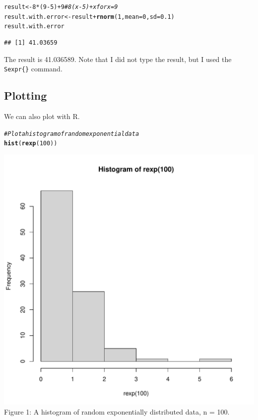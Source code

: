 \documentclass{article}\usepackage[]{graphicx}\usepackage[]{xcolor}
\makeatletter
\def\maxwidth{ %
  \ifdim\Gin@nat@width>\linewidth
    \linewidth
  \else
    \Gin@nat@width
  \fi
}
\newcommand{\hlnum}[1]{\textcolor[rgb]{0.686,0.059,0.569}{#1}}%
\newcommand{\hlcom}[1]{\textcolor[rgb]{0.678,0.584,0.686}{\textit{#1}}}%
\newcommand{\hlopt}[1]{\textcolor[rgb]{0,0,0}{#1}}%
\newcommand{\hldef}[1]{\textcolor[rgb]{0.345,0.345,0.345}{#1}}%
\newcommand{\hlkwb}[1]{\textcolor[rgb]{0.69,0.353,0.396}{#1}}%
\newcommand{\hlkwc}[1]{\textcolor[rgb]{0.333,0.667,0.333}{#1}}%
\newcommand{\hlkwd}[1]{\textcolor[rgb]{0.737,0.353,0.396}{\textbf{#1}}}%
\newenvironment{kframe}{%
 \def\at@end@of@kframe{}%
 \ifinner\ifhmode%
  \def\at@end@of@kframe{\end{minipage}}%
  \begin{minipage}{\columnwidth}%
 \fi\fi%
 \def\FrameCommand##1{\hskip\@totalleftmargin \hskip-\fboxsep
 \colorbox{shadecolor}{##1}\hskip-\fboxsep
     \hskip-\linewidth \hskip-\@totalleftmargin \hskip\columnwidth}%
 \MakeFramed {\advance\hsize-\width
   \@totalleftmargin\z@ \linewidth\hsize
   \@setminipage}}%
 {\par\unskip\endMakeFramed%
 \at@end@of@kframe}
\newenvironment{knitrout}{}{} %
\makeatother
\begin{document}
\begin{multicols}{2}
\begin{knitrout}
\color{fgcolor}\begin{kframe}
\begin{alltt}
\hldef{result} \hlkwb{<-} \hlnum{8}\hlopt{*}\hldef{(}\hlnum{9}\hlopt{-}\hlnum{5}\hldef{)} \hlopt{+} \hlnum{9} \hlcom{# 8(x-5) + x for x = 9}
\hldef{result.with.error} \hlkwb{<-} \hldef{result} \hlopt{+} \hlkwd{rnorm}\hldef{(}\hlnum{1}\hldef{,} \hlkwc{mean} \hldef{=} \hlnum{0}\hldef{,} \hlkwc{sd} \hldef{=} \hlnum{0.1}\hldef{)}
\hldef{result.with.error}
\end{alltt}
\begin{verbatim}
## [1] 41.03659
\end{verbatim}
\end{kframe}
\end{knitrout}
The result is 41.036589. Note that I did not type the result, but I used the \verb|Sexpr{}| command.
\subsection{Plotting}
We can also plot with R.
\begin{knitrout}\scriptsize
{}\color{fgcolor}\begin{kframe}
\begin{alltt}
\hlcom{#Plot a histogram of random exponential data}
\hlkwd{hist}\hldef{(}\hlkwd{rexp}\hldef{(}\hlnum{100}\hldef{))}
\end{alltt}
\end{kframe}
\includegraphics[width=\maxwidth]{figure/unnamed-chunk-6-1} 
\end{knitrout}
Figure 1: A histogram of random exponentially distributed
data, n = 100.
\columnbreak



\end{multicols}
\end{document}
